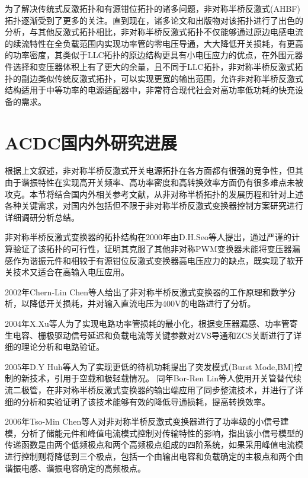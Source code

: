 为了解决传统式反激拓扑和有源钳位拓扑的诸多问题，非对称半桥反激式(AHBF)拓扑逐渐受到了更多的关注。直到现在，诸多论文和出版物对该拓扑进行了出色的分析\cite{chen2002analysis,kim2012analysis,huber2017analysis}，与其他反激式拓扑相比，非对称半桥反激式拓扑不仅能够通过原边电感电流的续流特性在全负载范围内实现功率管的零电压导通，大大降低开关损耗，有更高的功率密度，其类似于LLC拓扑的原边结构更具有小电压应力的优点，在外围元器件选择和变压器体积上有了更大的余量，且不同于LLC拓扑，非对称半桥反激式拓扑的副边类似传统反激式拓扑，可以实现更宽的输出范围，允许非对称半桥反激式结构适用于中等功率的电源适配器中，非常符合现代社会对高功率低功耗的快充设备的需求。

\section{ACDC国内外研究进展}

根据上文叙述，非对称半桥反激式开关电源拓扑在各方面都有很强的竞争性，但其由于谐振特性在实现高开关频率、高功率密度和高转换效率方面仍有很多难点未被攻克。本节将结合国内外相关参考文献，从非对称半桥拓扑的发展历程和针对上述各种关键需求，对国内外包括但不限于非对称半桥反激式变换器控制方案研究进行详细调研分析总结。

非对称半桥反激式变换器的拓扑结构在2000年由D.H.Seo等人提出，通过严谨的计算验证了该拓扑的可行性，证明其克服了其他非对称PWM变换器未能将变压器漏感作为谐振元件和相较于有源钳位反激式变换器高电压应力的缺点，既实现了软开关技术又适合在高输入电压应用\cite{seo2000_AHB}。

2002年Chern-Lin Chen等人给出了非对称半桥反激式变换器的工作原理和数学分析，以降低开关损耗，并对输入直流电压为400V的电路进行了分析\cite{chen2002_AHB,chen2002_AHB1}。

2004年X.Xu等人为了实现电路功率管损耗的最小化，根据变压器漏感、功率管寄生电容、栅极驱动信号延迟和负载电流等关键参数对ZVS导通和ZCS关断进行了详细的理论分析和电路验证\cite{xu2004_AHB}。

2005年D.Y Huh等人为了实现更低的待机功耗提出了突发模式(Burst Mode,BM)控制的新技术，引用于空载和极轻载情况\cite{choi2005_BM1,lo2008_BM2}。
同年Bor-Ren Lin等人使用开关管替代续流二极管，在非对称半桥反激式变换器的输出端应用了同步整流技术，并进行了详细的分析和实验证明了该技术能够有效的降低导通损耗，提高转换效率\cite{lin2005_AHB}。

2006年Tso-Min Chen等人对非对称半桥反激式变换器进行了功率级的小信号建模，分析了储能元件和峰值电流模式控制对传输特性的影响，指出该小信号模型的传递函数是由两个低频极点和两个高频极点组成的四阶系统，如果采用峰值电流模进行控制则将降低到三个极点，包括一个由输出电容和负载确定的主极点和两个由谐振电感、谐振电容确定的高频极点\cite{chen2006_AHB}。





